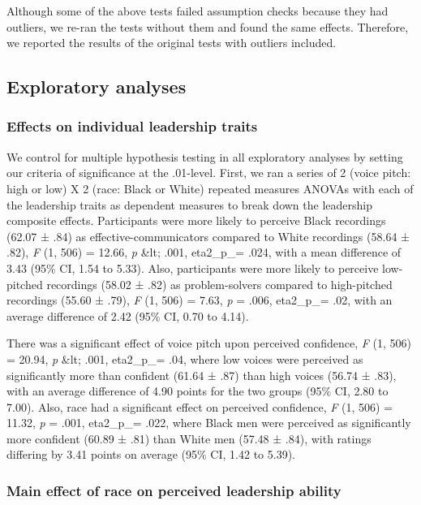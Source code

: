 \documentclass[
  english,
  man]{apa6}
\begin{document}
Although some of the above tests failed assumption checks because they had outliers, we re-ran the tests without them and found the same effects. Therefore, we reported the results of the original tests with outliers included.

\hypertarget{exploratory-analyses}{%
\subsection{Exploratory analyses}\label{exploratory-analyses}}

\hypertarget{effects-on-individual-leadership-traits}{%
\subsubsection{Effects on individual leadership traits}\label{effects-on-individual-leadership-traits}}

We control for multiple hypothesis testing in all exploratory analyses by setting our criteria of significance at the .01-level. First, we ran a series of 2 (voice pitch: high or low) X 2 (race: Black or White) repeated measures ANOVAs with each of the leadership traits as dependent measures to break down the leadership composite effects. Participants were more likely to perceive Black recordings (62.07 ± .84) as effective-communicators compared to White recordings (58.64 ± .82), \emph{F} (1, 506) = 12.66, \emph{p} \&lt; .001, eta2\_p\_= .024, with a mean difference of 3.43 (95\% CI, 1.54 to 5.33). Also, participants were more likely to perceive low-pitched recordings (58.02 ± .82) as problem-solvers compared to high-pitched recordings (55.60 ± .79), \emph{F} (1, 506) = 7.63, \emph{p} = .006, eta2\_p\_= .02, with an average difference of 2.42 (95\% CI, 0.70 to 4.14).

There was a significant effect of voice pitch upon perceived confidence, \emph{F} (1, 506) = 20.94, \emph{p} \&lt; .001, eta2\_p\_= .04, where low voices were perceived as significantly more than confident (61.64 ± .87) than high voices (56.74 ± .83), with an average difference of 4.90 points for the two groups (95\% CI, 2.80 to 7.00). Also, race had a significant effect on perceived confidence, \emph{F} (1, 506) = 11.32, \emph{p} = .001, eta2\_p\_= .022, where Black men were perceived as significantly more confident (60.89 ± .81) than White men (57.48 ± .84), with ratings differing by 3.41 points on average (95\% CI, 1.42 to 5.39).

\hypertarget{main-effect-of-race-on-perceived-leadership-ability}{%
\subsubsection{Main effect of race on perceived leadership ability}\label{main-effect-of-race-on-perceived-leadership-ability}}
\end{document}
